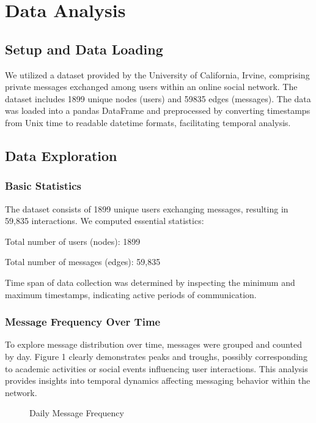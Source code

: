 \section{Data Analysis}

\subsection{Setup and Data Loading}
We utilized a dataset provided by the University of California, Irvine, comprising private messages exchanged among users within an online social network. The dataset includes 1899 unique nodes (users) and 59835 edges (messages). The data was loaded into a pandas DataFrame and preprocessed by converting timestamps from Unix time to readable datetime formats, facilitating temporal analysis.

\subsection{Data Exploration}

\subsubsection{Basic Statistics}
The dataset consists of 1899 unique users exchanging messages, resulting in 59,835 interactions. We computed essential statistics:

Total number of users (nodes): 1899

Total number of messages (edges): 59,835

Time span of data collection was determined by inspecting the minimum and maximum timestamps, indicating active periods of communication.

\subsubsection{Message Frequency Over Time}
To explore message distribution over time, messages were grouped and counted by day. Figure 1 clearly demonstrates peaks and troughs, possibly corresponding to academic activities or social events influencing user interactions. This analysis provides insights into temporal dynamics affecting messaging behavior within the network.

\begin{figure}[h]
\centering
\caption{Daily Message Frequency}
\label{fig:message_frequency}
\end{figure}

